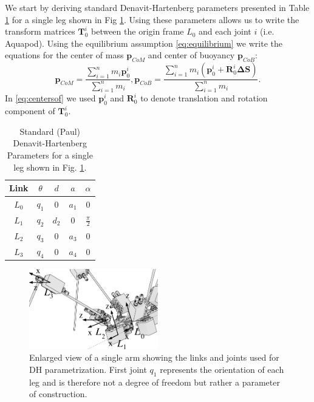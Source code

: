We start by deriving standard Denavit-Hartenberg parameters presented in Table \ref{tab:DHParameters} for a single leg shown in Fig \ref{fig:DHParameters}. Using these parameters allows us to write the transform matrices $\textbf{T}_0^i$ between the origin frame $L_0$ and each joint $i$ (i.e. Aquapod). Using the equilibrium assumption \eqref{eq:equilibrium} we write the equations for the center of mass $\textbf{p}_{CoM}$ and center of buoyancy $\textbf{p}_{CoB}$:
\begin{equation}\label{eq:centersof}
\textbf{p}_{CoM} = \frac{\sum_{i=1}^n m_i \textbf{p}_0^i}{\sum_{i=1}^n m_i},\textbf{p}_{CoB} = \frac{\sum_{i=1}^n m_i( \textbf{p}_0^i+\textbf{R}_0^i \boldsymbol{\Delta}\textbf{S})}{\sum_{i=1}^n m_i}.
\end{equation} 
In \eqref{eq:centersof} we used $\textbf{p}_0^i$ and $\textbf{R}_0^i$ to denote translation and rotation component of $\textbf{T}_0^i$.

\begin{table}[!t]
	\centering
	\caption{{Standard (Paul)} Denavit-Hartenberg Parameters for a single leg shown in Fig. \ref{fig:DHParameters}.}\label{tab:DHParameters}
	\begin{tabular}{ccccc}
		Link & $\theta$ & $d$ & $a$ & $\alpha$ \\\hline
		$L_0$ & $q_1$ & $0$ & $a_1$ & $0$\\
		$L_1$ & $q_2$ & $d_2$ & $0$ & $\frac{\pi}{2}$\\
		$L_2$ & $q_3$ & $0$ & $a_3$ & $0$\\
		$L_3$ & $q_4$ & $0$ & $a_4$ & $0$
	\end{tabular}
\end{table}

\begin{figure}
	\centering
	\includegraphics[width=0.5\textwidth]{./img/DHParameters.pdf}
	\caption{Enlarged view of a single arm showing the links and joints used for DH parametrization. First joint $q_1$ represents the orientation of each leg and is therefore not a degree of freedom but rather a parameter of construction.}
	\label{fig:DHParameters}
\end{figure}


